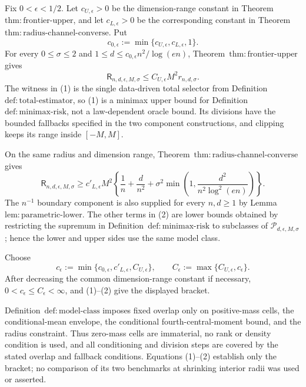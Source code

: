 Fix \(0<\epsilon<1/2\).  Let \(c_{U,\epsilon}>0\) be the dimension-range constant in Theorem~\(\mathrm{thm:frontier\text{-}upper}\), and let \(c_{L,\epsilon}>0\) be the corresponding constant in Theorem~\(\mathrm{thm:radius\text{-}channel\text{-}converse}\).  Put
\[
 c_{0,\epsilon}:=\min\{c_{U,\epsilon},c_{L,\epsilon},1\}.
\]
For every \(0\le\sigma\le2\) and \(1\le d\le c_{0,\epsilon}n^2/\log(en)\), Theorem~\(\mathrm{thm:frontier\text{-}upper}\) gives
\[
 \mathsf R_{n,d,\epsilon,M,\sigma}
 \le C_{U,\epsilon}M^2r_{n,d,\sigma}.
\tag{1}
\]
The witness in (1) is the single data-driven total selector from Definition~\(\mathrm{def:total\text{-}estimator}\), so (1) is a minimax upper bound for Definition~\(\mathrm{def:minimax\text{-}risk}\), not a law-dependent oracle bound.  Its divisions have the bounded fallbacks specified in the two component constructions, and clipping keeps its range inside \([-M,M]\).

On the same radius and dimension range, Theorem~\(\mathrm{thm:radius\text{-}channel\text{-}converse}\) gives
\[
 \mathsf R_{n,d,\epsilon,M,\sigma}
 \ge c'_{L,\epsilon}M^2\left\{
 \frac1n+\frac d{n^2}
 +\sigma^2\min\left(1,\frac{d^2}{n^2\log^2(en)}\right)
 \right\}.
\tag{2}
\]
The \(n^{-1}\) boundary component is also supplied for every \(n,d\ge1\) by Lemma~\(\mathrm{lem:parametric\text{-}lower}\).  The other terms in (2) are lower bounds obtained by restricting the supremum in Definition~\(\mathrm{def:minimax\text{-}risk}\) to subclasses of \(\mathcal P_{d,\epsilon,M,\sigma}\); hence the lower and upper sides use the same model class.

Choose
\[
 c_{\epsilon}:=\min\{c_{0,\epsilon},c'_{L,\epsilon},C_{U,\epsilon}\},
 \qquad
 C_{\epsilon}:=\max\{C_{U,\epsilon},c_{\epsilon}\}.
\]
After decreasing the common dimension-range constant if necessary, \(0<c_{\epsilon}\le C_{\epsilon}<\infty\), and (1)--(2) give the displayed bracket.

Definition~\(\mathrm{def:model\text{-}class}\) imposes fixed overlap only on positive-mass cells, the conditional-mean envelope, the conditional fourth-central-moment bound, and the radius constraint.  Thus zero-mass cells are immaterial, no rank or density condition is used, and all conditioning and division steps are covered by the stated overlap and fallback conditions.  Equations (1)--(2) establish only the bracket; no comparison of its two benchmarks at shrinking interior radii was used or asserted.